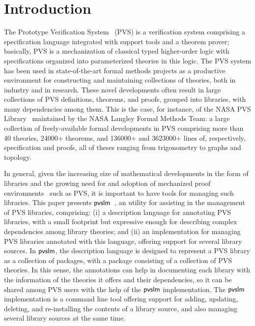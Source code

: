 \section{Introduction}
\label{sec.intro}

The Prototype Verification System~\cite{pvs-cade92} (PVS) is a
verification system comprising a specification language integrated
with support tools and a theorem prover; basically, PVS is a
mechanization of classical typed higher-order logic with
specifications organized into parameterized theories in this logic.
The PVS system has been used in state-of-the-art formal methods
projects as a productive environment for constructing and maintaining
collections of theories, both in industry and in research. These novel
developments often result in large collections of PVS definitions,
theorems, and proofs, grouped into libraries, with many dependencies
among them. This is the case, for instance, of the NASA PVS
Library~\cite{nasalib} maintained by the NASA Langley Formal Methods
Team: a large collection of freely-available formal developments in
PVS comprising more than 40 theories, 24000+ theorems, and 136000+ and
3623000+ lines of, respectively, specification and proofs, all of
theses ranging from trigonometry to graphs and topology.  

In general, given the increasing size of mathematical developments in the 
form of libraries and the growing need for and adoption of mechanized 
proof environments~\cite{avigad-mech14,hales-proofs14} such as PVS, it is 
important to have tools for managing such libraries. This paper presents 
$\textsf{pvslm}$~\cite{pvslm}, an utility for assisting in the management of PVS 
libraries, comprising: (i) a description language for annotating PVS libraries, 
with a small footprint but expressive enough for describing complex 
dependencies among library theories; and (ii) an implementation for 
managing PVS libraries annotated with this language, offering support 
for several library sources. In $\textsf{pvslm}$, the description language is 
designed to represent a PVS library as a collection of packages, with 
a package consisting of a collection of PVS theories. In this sense, the 
annotations can help in documenting each library with the information 
of the theories it offers and their dependencies, so it can be shared 
among PVS users with the help of the $\textsf{pvslm}$ implementation. The 
$\textsf{pvslm}$ implementation is a command line tool offering support for
adding, updating, deleting, and re-installing the contents of a
library source, and also managing several library sources at the same
time.

